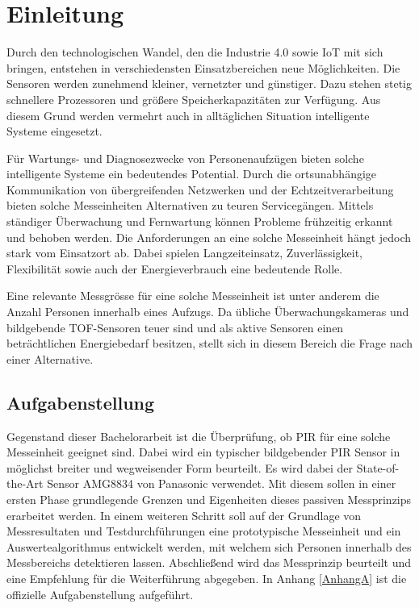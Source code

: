 \chapter{Einleitung}
\label{chap:Einleitung}


\label{sec:Ausgangssituation}
Durch den technologischen Wandel, den die Industrie 4.0 sowie \ac{IoT}  mit sich bringen, entstehen in verschiedensten Einsatzbereichen neue Möglichkeiten. Die Sensoren werden zunehmend kleiner, vernetzter und günstiger. Dazu stehen stetig schnellere Prozessoren und größere Speicherkapazitäten zur Verfügung. Aus diesem Grund werden vermehrt auch in alltäglichen Situation intelligente Systeme eingesetzt. 

Für Wartungs- und Diagnosezwecke von Personenaufzügen bieten solche intelligente Systeme ein bedeutendes Potential. Durch die ortsunabhängige Kommunikation von übergreifenden Netzwerken und der Echtzeitverarbeitung bieten solche Messeinheiten Alternativen zu teuren Servicegängen. Mittels ständiger Überwachung und Fernwartung können Probleme frühzeitig erkannt und behoben werden. Die Anforderungen an eine solche Messeinheit hängt jedoch stark vom Einsatzort ab. Dabei spielen Langzeiteinsatz, Zuverlässigkeit, Flexibilität sowie auch der Energieverbrauch eine bedeutende Rolle.

Eine relevante Messgrösse für eine solche Messeinheit ist unter anderem die Anzahl Personen innerhalb eines Aufzugs. Da übliche Überwachungskameras und bildgebende TOF-Sensoren teuer sind und als aktive Sensoren einen beträchtlichen Energiebedarf besitzen, stellt sich in diesem Bereich die Frage nach einer Alternative.

\section{Aufgabenstellung}
\label{chap:Aufgabenstellung}
Gegenstand dieser Bachelorarbeit ist die Überprüfung, ob \ac{PIR} für eine solche Messeinheit geeignet sind. Dabei wird ein typischer bildgebender \ac{PIR} Sensor in möglichst breiter und wegweisender Form beurteilt. Es wird dabei der State-of-the-Art Sensor AMG8834 von Panasonic verwendet. Mit diesem sollen in einer ersten Phase grundlegende Grenzen und Eigenheiten dieses passiven Messprinzips erarbeitet werden. In einem weiteren Schritt soll auf der Grundlage von Messresultaten und Testdurchführungen eine prototypische Messeinheit und ein Auswertealgorithmus entwickelt werden, mit welchem sich Personen innerhalb des Messbereichs detektieren lassen. Abschließend wird das Messprinzip beurteilt und eine Empfehlung für die Weiterführung abgegeben. In Anhang \ref{AnhangA} ist die offizielle Aufgabenstellung aufgeführt.

